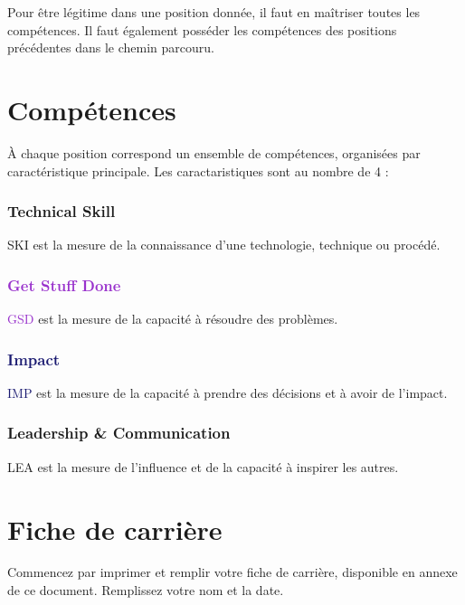 \documentclass[a4paper, french, openany, 12pt]{book}
\newcommand\dexterity{\textcolor{BrickRed}{Technical Skill}}
\newcommand\strength{\textcolor{DarkOrchid}{Get Stuff Done}}
\newcommand\wisdom{\textcolor{MidnightBlue}{Impact}}
\newcommand\charisma{\textcolor{OliveGreen}{Leadership \& Communication}}
\begin{document}
\begin{multicols}{2}
  Pour être légitime dans une position donnée, il faut en maîtriser toutes les compétences.
  Il faut également posséder les compétences des positions précédentes dans le chemin parcouru.
  
  \section*{Compétences}
  
  À chaque position correspond un ensemble de compétences, organisées par caractéristique principale.
  Les caractaristiques sont au nombre de 4 :
  
  \subsubsection*{\dexterity} 
  
  \textcolor{BrickRed}{\uppercase{ski}} est la mesure de la connaissance d'une technologie, technique ou procédé.
  
  \subsubsection*{\strength} 
  
  \textcolor{DarkOrchid}{\uppercase{gsd}} est la mesure de la capacité à résoudre des problèmes.
  
  \subsubsection*{\wisdom} 
  
  \textcolor{MidnightBlue}{\uppercase{imp}} est la mesure de la capacité à prendre des décisions et à avoir de l'impact.
  
  \subsubsection*{\charisma} 
  
  \textcolor{OliveGreen}{\uppercase{lea}} est la mesure de l'influence et de la capacité à inspirer les autres.
  
  \section*{Fiche de carrière}

  Commencez par imprimer et remplir votre fiche de carrière, disponible en annexe de ce document.
  Remplissez votre nom et la date.


\end{multicols}
\end{document}
